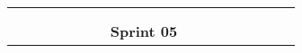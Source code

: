 \begin{longtable}[c]{llclllllllllllllllll}
        \multicolumn{4}{|l|}{}                                                                                                                                                                                                                                                                                                                                                             & \multicolumn{15}{l|}{}                                                                                                                                                                                                                                                                                                                                                                                                                                                                                                                    &  \\ \cline{1-19}
        \multicolumn{1}{|l|}{}                                                                                                  & \multicolumn{1}{l|}{}                                                          & \multicolumn{1}{l|}{}                                                            & \multicolumn{1}{l|}{}                                                                &                                 &                                 &                                 &                                 &                                 &                                 &                                 &                                 &                                 &                                 &                                 &                                 &                                 &                                 & \multicolumn{1}{l|}{}                         &  \\ \cline{1-19}
        \multicolumn{19}{|c|}{\cellcolor[HTML]{8EA9D8}\textbf{Sprint 05}}                                                                                                                                                                                                                                                                                                                                                                                                                                                                                                                                                                                                                                                                                                                                                                                                                                                              &  \\ \cline{1-19}

\end{longtable}
